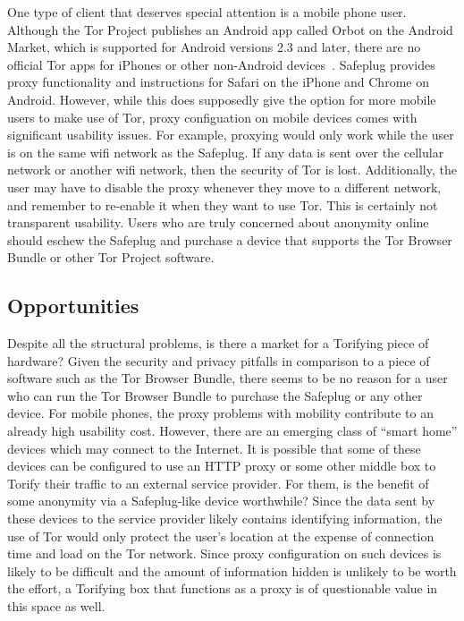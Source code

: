 \documentclass[letterpaper,twocolumn,10pt]{article}
\begin{document}
One type of client that deserves special attention is a mobile phone user.  Although the Tor Project publishes an Android app called Orbot on the Android Market, which is supported for Android versions 2.3 and later, there are no official Tor apps for iPhones or other non-Android devices~\cite{orbot,amorbot}.  Safeplug provides proxy functionality and instructions for Safari on the iPhone and Chrome on Android.  However, while this does supposedly give the option for more mobile users to make use of Tor, proxy configuation on mobile devices comes with significant usability issues.  For example, proxying would only work while the user is on the same wifi network as the Safeplug.  If any data is sent over the cellular network or another wifi network, then the security of Tor is lost.  Additionally, the user may have to disable the proxy whenever they move to a different network, and remember to re-enable it when they want to use Tor.  This is certainly not transparent usability.  Users who are truly concerned about anonymity online should eschew the Safeplug and purchase a device that supports the Tor Browser Bundle or other Tor Project software.

\subsection{Opportunities}
Despite all the structural problems, is there a market for a Torifying piece of hardware?  Given the security and privacy pitfalls in comparison to a piece of software such as the Tor Browser Bundle, there seems to be no reason for a user who can run the Tor Browser Bundle to purchase the Safeplug or any other device.  For mobile phones, the proxy problems with mobility contribute to an already high usability cost.  However, there are an emerging class of ``smart home'' devices which may connect to the Internet.  It is possible that some of these devices can be configured to use an HTTP proxy or some other middle box to Torify their traffic to an external service provider.  For them, is the benefit of some anonymity via a Safeplug-like device worthwhile?  Since the data sent by these devices to the service provider likely contains identifying information, the use of Tor would only protect the user's location at the expense of connection time and load on the Tor network.  Since proxy configuration on such devices is likely to be difficult and the amount of information hidden is unlikely to be worth the effort, a Torifying box that functions as a proxy is of questionable value in this space as well.
\end{document}
